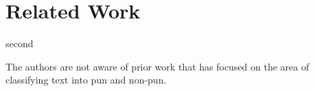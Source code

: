 \section{Related Work}

\cite{kaofunny}
second\cite{ritchie2005computational}

The authors are not aware of prior work that has focused on the area of classifying text into pun and non-pun.